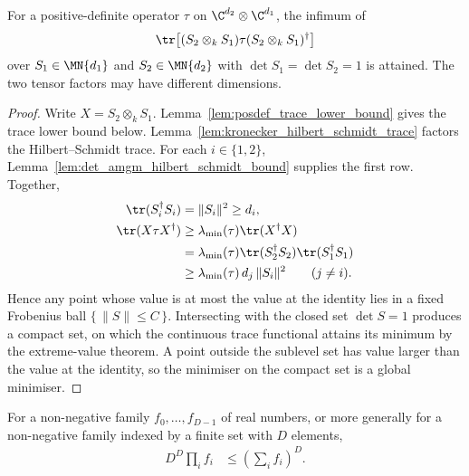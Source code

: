 \begin{lemma}\label{lem:infimum_is_attained}
    \leanok
    For a positive-definite operator $\tau$ on $\C^{d_2}\otimes\C^{d_1}$,
    the infimum of
    \begin{align}
        \tr\!\left[(S_{2}\otimes_{k}S_{1})\tau
            (S_{2}\otimes_{k}S_{1})^{\dagger}\right]
        \notag
    \end{align}
    over $S_{1}\in\MN{d_1}$ and $S_{2}\in\MN{d_2}$ with
    $\det S_{1}=\det S_{2}=1$ is attained.  The two tensor factors may have
    different dimensions.
\end{lemma}

\begin{proof}\leanok
    Write $X=S_{2}\otimes_{k}S_{1}$.
    Lemma~\ref{lem:posdef_trace_lower_bound} gives the trace lower bound below.
    Lemma~\ref{lem:kronecker_hilbert_schmidt_trace} factors the
    Hilbert--Schmidt trace. For each $i\in\{1,2\}$,
    Lemma~\ref{lem:det_amgm_hilbert_schmidt_bound} supplies the first row.
    Together,
    \begin{align}
        \tr(S_i^\dagger S_i)
        &=\|S_i\|^2\geq d_i,
        \notag\\
        \tr(X\tau X^\dagger)
        &\geq\lambda_{\min}(\tau)\tr(X^\dagger X)
        \notag\\
        &=\lambda_{\min}(\tau)
          \tr(S_2^\dagger S_2)\tr(S_1^\dagger S_1)
        \notag\\
        &\geq\lambda_{\min}(\tau)\,d_j\,\|S_i\|^2
          \qquad (j\neq i).
        \notag
    \end{align}
    Hence any point
    whose value is at most the value at the identity lies in a fixed
    Frobenius ball $\{\,\|S\|\leq C\,\}$. Intersecting with the closed set
    $\det S=1$ produces a compact set, on which the continuous trace
    functional attains its minimum by the extreme-value theorem. A point
    outside the sublevel set has value larger than the value at the identity,
    so the minimiser on the compact set is a global minimiser.
\end{proof}

\begin{lemma}
\label{lem:amgm_prod_sum}
    \leanok
    For a non-negative family $f_{0},\ldots,f_{D-1}$ of real numbers, or more
    generally for a non-negative family indexed by a finite set with $D$
    elements,
    \begin{align}
        D^{D}\prod_{i}f_{i}
        &\leq\left(\sum_{i}f_{i}\right)^{D}.
        \label{eq:representations_amgm_prod_sum}
    \end{align}
\end{lemma}

